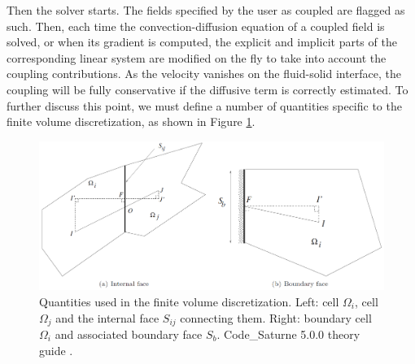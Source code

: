 \documentclass{svjour3}                     %
\begin{document}
Then the solver starts.
The fields specified by the user as coupled are flagged as such.
Then, each time the convection-diffusion equation of a coupled field is solved, or when its gradient is computed, the explicit and implicit parts of the corresponding linear system are modified on the fly to take into account the coupling contributions.
As the velocity vanishes on the fluid-solid interface, the coupling will be fully conservative if the diffusive term is correctly estimated.
To further discuss this point, we must define a number of quantities specific to the finite volume discretization, as shown in Figure \ref{fig-cell_face}.

\begin{figure}
\centering
\includegraphics[width=\textwidth]{./images/cell_face.png}
\caption{
Quantities used in the finite volume discretization.
Left: cell $\Omega_i$, cell $\Omega_j$ and the internal face $S_{ij}$ connecting them.
Right: boundary cell $\Omega_i$ and associated boundary face $S_b$.
{\selectfont Code\_Saturne} 5.0.0 theory guide \cite{saturne2017}.
}\label{fig-cell_face}
\end{figure}
\end{document}
